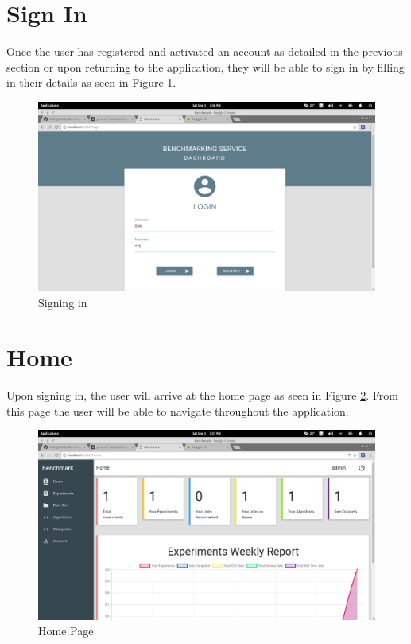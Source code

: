 \documentclass[11pt,a4paper]{article}
\begin{document}
\section{Sign In}
Once the user has registered and activated an account as detailed in the previous section or upon returning to the application,
they will be able to sign in by filling in their details as seen in Figure \ref{fig:signPage}.
\begin{figure}[H]
	\begin{center}
		\includegraphics[scale=0.3]{../Images/User Manual/Sign in Page.png}
		\caption{Signing in}
		\label{fig:signPage}
	\end{center}  
\end{figure}

\section{Home}
Upon signing in, the user will arrive at the home page as seen in Figure \ref{fig:homePage}. From this page the user will be able 
to navigate throughout the application.
\begin{figure}[H]
	\begin{center}
		\includegraphics[scale=0.3]{../Images/User Manual/Home Page.png}
		\caption{Home Page}
		\label{fig:homePage}
	\end{center}  
\end{figure}
\end{document}
